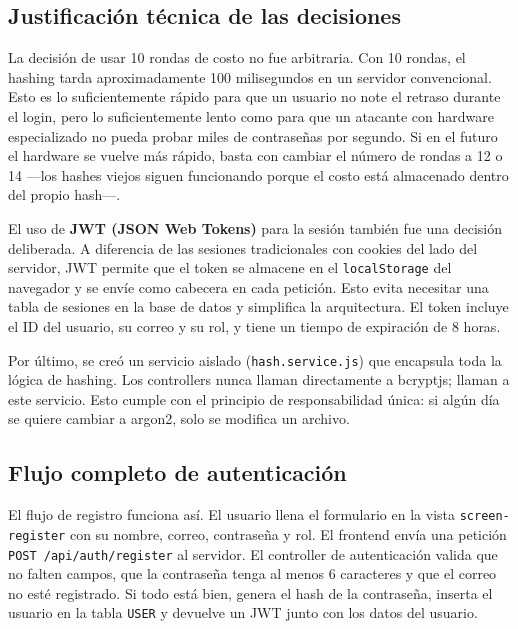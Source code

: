 \documentclass[journal]{IEEEtran}
\begin{document}
	\subsection{Justificaci\'{o}n t\'{e}cnica de las decisiones}
	\label{subsec:justificacion}
	
	La decisi\'{o}n de usar 10 rondas de costo no fue arbitraria.
	Con 10 rondas, el hashing tarda aproximadamente 100
	milisegundos en un servidor convencional. Esto es lo
	suficientemente r\'{a}pido para que un usuario no note el
	retraso durante el login, pero lo suficientemente lento como
	para que un atacante con hardware especializado no pueda
	probar miles de contrase\~{n}as por segundo. Si en el futuro
	el hardware se vuelve m\'{a}s r\'{a}pido, basta con cambiar
	el n\'{u}mero de rondas a 12 o 14 ---los hashes viejos siguen
	funcionando porque el costo est\'{a} almacenado dentro del
	propio hash---.
	
	El uso de \textbf{JWT (JSON Web Tokens)} para la sesi\'{o}n
	tambi\'{e}n fue una decisi\'{o}n deliberada. A diferencia de
	las sesiones tradicionales con cookies del lado del servidor,
	JWT permite que el token se almacene en el
	\texttt{localStorage} del navegador y se env\'{i}e como
	cabecera en cada petici\'{o}n. Esto evita necesitar una tabla
	de sesiones en la base de datos y simplifica la
	arquitectura. El token incluye el ID del usuario, su correo
	y su rol, y tiene un tiempo de expiraci\'{o}n de 8 horas.
	
	Por \'{u}ltimo, se cre\'{o} un servicio aislado
	(\texttt{hash.service.js}) que encapsula toda la
	l\'{o}gica de hashing. Los controllers nunca llaman directamente
	a bcryptjs; llaman a este servicio. Esto cumple con el principio
	de responsabilidad \'{u}nica: si alg\'{u}n d\'{i}a se quiere
	cambiar a argon2, solo se modifica un archivo.
	
	\subsection{Flujo completo de autenticaci\'{o}n}
	\label{subsec:flujo-auth}
	
	El flujo de registro funciona as\'{i}. El usuario llena el
	formulario en la vista \texttt{screen-register} con su nombre,
	correo, contrase\~{n}a y rol. El frontend env\'{i}a una
	petici\'{o}n \texttt{POST /api/auth/register} al servidor. El
	controller de autenticaci\'{o}n valida que no falten campos, que
	la contrase\~{n}a tenga al menos 6 caracteres y que el correo no
	est\'{e} registrado. Si todo est\'{a} bien, genera el hash de la
	contrase\~{n}a, inserta el usuario en la tabla \texttt{USER} y
	devuelve un JWT junto con los datos del usuario.
	
\end{document}
